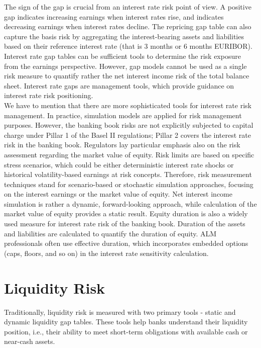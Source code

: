 \documentclass[11pt]{article}
\begin{document}
The sign of the gap is crucial from an interest rate risk point of view. A positive
gap indicates increasing earnings when interest rates rise, and indicates decreasing earnings when interest rates decline. The repricing gap table can also capture the basis risk by aggregating the interest-bearing assets and liabilities based on their reference interest rate (that is 3 months or 6 months EURIBOR). Interest rate gap tables can be sufficient tools to determine the risk exposure from the earnings perspective. However, gap models cannot be used as a single risk measure to quantify rather the net interest income risk of the total balance sheet. Interest rate gaps are management tools, which provide guidance on interest rate risk positioning.\\

We have to mention that there are more sophisticated tools for interest rate risk management. In practice, simulation models are applied for risk management purposes. However, the banking book risks are not explicitly subjected to capital charge under Pillar 1 of the Basel II regulations; Pillar 2 covers the interest rate
risk in the banking book. Regulators lay particular emphasis also on the risk assessment regarding the market value of equity. Risk limits are based on specific stress scenarios, which could be either deterministic interest rate shocks or historical volatility-based earnings at risk concepts. Therefore, risk measurement techniques stand for scenario-based or stochastic simulation approaches, focusing on the interest earnings or the market value of equity. Net interest income simulation is rather a dynamic, forward-looking approach, while calculation of the market value of equity provides a static result. Equity duration is also a widely used measure for interest rate risk of the banking book. Duration of the assets and liabilities are calculated
to quantify the duration of equity. ALM professionals often use effective duration, which incorporates embedded options (caps, floors, and so on) in the interest rate sensitivity calculation.



\section{Liquidity Risk}

Traditionally, liquidity risk is measured with two primary tools - static and dynamic liquidity gap tables. These tools help banks understand their liquidity position, i.e., their ability to meet short-term obligations with available cash or near-cash assets.\\
\end{document}
